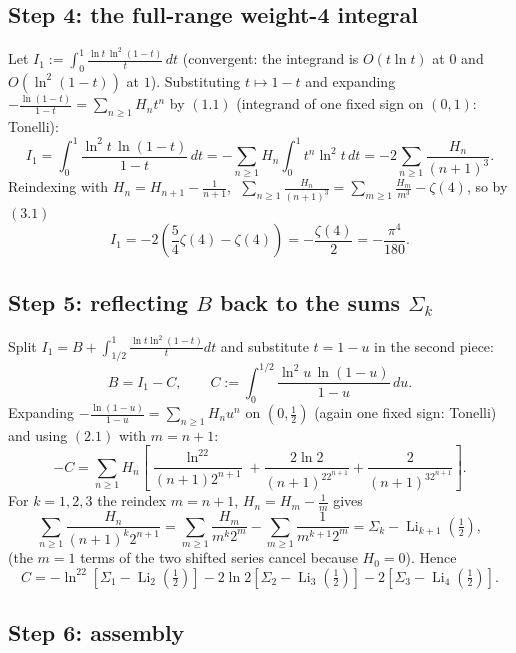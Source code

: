 \documentclass[11pt]{article}
\theoremstyle{remark}
\begin{document}
\subsection*{Step 4: the full-range weight-4 integral}

Let $I_1:=\displaystyle\int_0^1\frac{\ln t\,\ln^2(1-t)}{t}\,dt$ (convergent: the integrand is $O(t\ln t)$ at $0$ and $O(\ln^2(1-t))$ at $1$). Substituting $t\mapsto 1-t$ and expanding $-\frac{\ln(1-t)}{1-t}=\sum_{n\ge1}H_nt^n$ by $(1.1)$ (integrand of one fixed sign on $(0,1)$: Tonelli):
$$I_1=\int_0^1\frac{\ln^2t\,\ln(1-t)}{1-t}\,dt=-\sum_{n\ge1}H_n\int_0^1t^{n}\ln^2t\,dt
=-2\sum_{n\ge1}\frac{H_n}{(n+1)^3}.$$
Reindexing with $H_n=H_{n+1}-\frac1{n+1}$, $\;\sum_{n\ge1}\frac{H_n}{(n+1)^3}=\sum_{m\ge1}\frac{H_m}{m^3}-\zeta(4)$, so by $(3.1)$
\begin{equation}I_1=-2\left(\frac54\zeta(4)-\zeta(4)\right)=-\frac{\zeta(4)}{2}=-\frac{\pi^4}{180}. \tag{4.1}\end{equation}

\subsection*{Step 5: reflecting $B$ back to the sums $\Sigma_k$}

Split $I_1=B+\int_{1/2}^1\frac{\ln t\ln^2(1-t)}{t}dt$ and substitute $t=1-u$ in the second piece:
\begin{equation}B=I_1-C,\qquad C:=\int_0^{1/2}\frac{\ln^2u\,\ln(1-u)}{1-u}\,du. \tag{5.1}\end{equation}
Expanding $-\frac{\ln(1-u)}{1-u}=\sum_{n\ge1}H_nu^n$ on $(0,\tfrac12)$ (again one fixed sign: Tonelli) and using $(2.1)$ with $m=n+1$:
$$-C=\sum_{n\ge1}H_n\left[\frac{\ln^22}{(n+1)2^{n+1}}+\frac{2\ln2}{(n+1)^22^{n+1}}+\frac{2}{(n+1)^32^{n+1}}\right].$$
For $k=1,2,3$ the reindex $m=n+1$, $H_n=H_m-\tfrac1m$ gives
$$\sum_{n\ge1}\frac{H_n}{(n+1)^k2^{n+1}}=\sum_{m\ge1}\frac{H_m}{m^k2^m}-\sum_{m\ge1}\frac{1}{m^{k+1}2^m}
=\Sigma_k-\operatorname{Li}_{k+1}\!\left(\tfrac12\right),$$
(the $m=1$ terms of the two shifted series cancel because $H_0=0$). Hence
\begin{equation}C=-\ln^22\left[\Sigma_1-\operatorname{Li}_2\!\left(\tfrac12\right)\right]
-2\ln2\left[\Sigma_2-\operatorname{Li}_3\!\left(\tfrac12\right)\right]
-2\left[\Sigma_3-\operatorname{Li}_4\!\left(\tfrac12\right)\right]. \tag{5.2}\end{equation}

\subsection*{Step 6: assembly}
\end{document}
